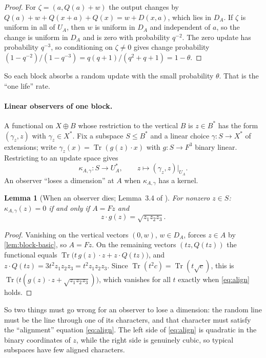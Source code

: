 \documentclass[11pt]{article}
\newtheorem{lemma}[theorem]{Lemma}
\theoremstyle{definition}
\theoremstyle{remark}
\DeclareMathOperator{\Tr}{Tr}
\begin{document}
\begin{proof}
For $\zeta=(a,Q(a)+w)$ the output changes by $Q(a)+w+Q(x+a)+Q(x)=w+D(x,a)$,
which lies in $D_A$. If $\zeta$ is uniform in all of $U_A$, then $w$ is uniform
in $D_A$ and independent of $a$, so the change is uniform in $D_A$ and is zero
with probability $q^{-2}$. The zero update has probability $q^{-3}$, so
conditioning on $\zeta\ne0$ gives change probability
$(1-q^{-2})/(1-q^{-3})=q(q+1)/(q^2+q+1)=1-\theta$.
\end{proof}

So each block absorbs a random update with the small probability $\theta$.
That is the ``one life'' rate.

\paragraph{Linear observers of one block.} A functional on $X\oplus B$
whose restriction to the vertical $B$ is $z\in B^*$ has the form $(\gamma_z,z)$
with $\gamma_z\in X^*$. Fix a subspace $S\le B^*$ and a linear choice
$\gamma\colon S\to X^*$ of extensions; write $\gamma_z(x)=\Tr(g(z)\cdot x)$
with $g\colon S\to F^3$ binary linear. Restricting to an update space gives
\[
\kappa_{A,\gamma}\colon S\to U_A^*,\qquad z\mapsto(\gamma_z,z)|_{U_A}.
\]
An observer ``loses a dimension'' at $A$ when $\kappa_{A,\gamma}$ has a
kernel.

\begin{lemma}[When an observer dies; Lemma~3.4 of \cite{OpenAI-UGC}]\label{lem:kernel}
For nonzero $z\in S$: $\kappa_{A,\gamma}(z)=0$ if and only if $A=Fz$ and
\begin{equation}\label{eq:align}
z\cdot g(z)=\sqrt{z_1z_2z_3}.
\end{equation}
\end{lemma}

\begin{proof}
Vanishing on the vertical vectors $(0,w)$, $w\in D_A$, forces $z\in A$ by
\cref{lem:block-basic}, so $A=Fz$. On the remaining vectors $(tz,Q(tz))$ the
functional equals $\Tr\bigl(t\,g(z)\cdot z+z\cdot Q(tz)\bigr)$, and
$z\cdot Q(tz)=3t^2z_1z_2z_3=t^2z_1z_2z_3$. Since
$\Tr(t^2c)=\Tr(t\sqrt c)$, this is $\Tr\bigl(t(g(z)\cdot z+\sqrt{z_1z_2z_3})\bigr)$,
which vanishes for all $t$ exactly when \eqref{eq:align} holds.
\end{proof}

So two things must go wrong for an observer to lose a dimension: the random line
must be the line through one of its characters, and that character must
satisfy the ``alignment'' equation \eqref{eq:align}. The left side of
\eqref{eq:align} is quadratic in the binary coordinates of $z$, while the right
side is genuinely cubic, so typical subspaces have few aligned characters.
\end{document}
